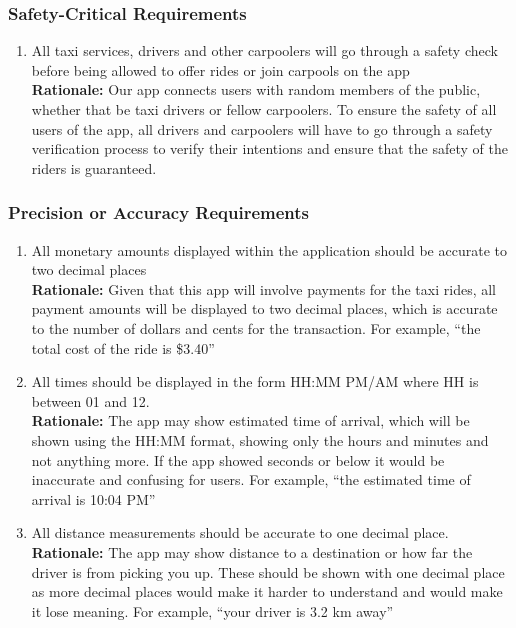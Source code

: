 \documentclass[]{article}
\begin{document}
\subsubsection{Safety-Critical Requirements}
\label{ssub:safety_critical_requirements}
\begin{enumerate}[{PR-SC}1. ]
	\item All taxi services, drivers and other carpoolers will go through a safety check before being allowed to offer rides or join carpools on the app \\
	{\bf Rationale:} Our app connects users with random members of the public, whether that be taxi drivers or fellow carpoolers. To ensure the safety of all users of the app, all drivers and carpoolers will have to go through a safety verification process to verify their intentions and ensure that the safety of the riders is guaranteed.
\end{enumerate}

\subsubsection{Precision or Accuracy Requirements}
\label{ssub:precision_or_accuracy_requirements}
\begin{enumerate}[{PR-PA}1. ]
	\item All monetary amounts displayed within the application should be accurate to two decimal places \\
	{\bf Rationale:} Given that this app will involve payments for the taxi rides, all payment amounts will be displayed to two decimal places, which is accurate to the number of dollars and cents for the transaction. For example, ``the total cost of the ride is \$3.40'' \\
	\item All times should be displayed in the form HH:MM PM/AM where HH is between 01 and 12. \\
	{\bf Rationale:} The app may show estimated time of arrival, which will be shown using the HH:MM format, showing only the hours and minutes and not anything more. If the app showed seconds or below it would be inaccurate and confusing for users. For example, ``the estimated time of arrival is 10:04 PM'' \\
	\item All distance measurements should be accurate to one decimal place. \\
	{\bf Rationale:} The app may show distance to a destination or how far the driver is from picking you up. These should be shown with one decimal place as more decimal places would make it harder to understand and would make it lose meaning. For example, ``your driver is 3.2 km away''
\end{enumerate}
\end{document}
